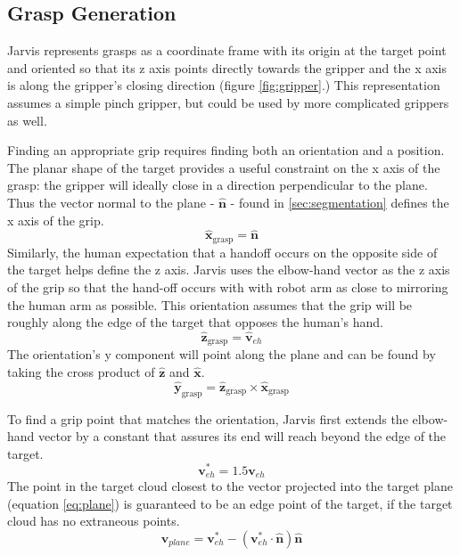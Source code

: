 \documentclass[10pt]{article}
\begin{document}
\subsection{Grasp Generation}\label{sec:graspgen} 
Jarvis represents grasps as a coordinate frame with its origin at the target point and oriented so that its z axis points directly towards the gripper and the x axis is along the gripper's closing direction (figure \ref{fig:gripper}.) This representation assumes a simple pinch gripper, but could be used by more complicated grippers as well. 
\par Finding an appropriate grip requires finding both an orientation and a position. The planar shape of the target provides a useful constraint on the x axis of the grasp: the gripper will ideally close in a direction perpendicular to the plane. Thus the vector normal to the plane - $\hat{\textbf{n}}$ - found in \ref{sec:segmentation} defines the x axis of the grip.
\begin{equation}
\hat{\textbf{x}}_{\text{grasp}} = \hat{\textbf{n}}
\end{equation}
 Similarly, the human expectation that a handoff occurs on the opposite side of the target helps define the z axis. Jarvis uses the elbow-hand vector as the z axis of the grip so that the hand-off occurs with with robot arm as close to mirroring the human arm as possible. This orientation assumes that the grip will be roughly along the edge of the target that opposes the human's hand.
 \begin{equation}
\hat{\textbf{z}}_{\text{grasp}} = \hat{\textbf{v}}_{eh}
\end{equation}
The orientation's y component will point along the plane and can be found by taking the cross product of $\hat{\textbf{z}}$ and $\hat{\textbf{x}}$.
\begin{equation}
\hat{\textbf{y}}_{\text{grasp}} = \hat{\textbf{z}}_{\text{grasp}} \times \hat{\textbf{x}}_{\text{grasp}}
\end{equation}
\par To find a grip point that matches the orientation,  Jarvis first extends the elbow-hand vector by a constant that assures its end will reach beyond the edge of the target.
\begin{equation} \label{eq:vec_ext}
\textbf{v}_{eh}^* = 1.5 \textbf{v}_{eh}
\end{equation}
The point in the target cloud closest to the vector projected into the target plane (equation \ref{eq:plane}) is guaranteed to be an edge point of the target, if the target cloud has no extraneous points. 
\begin{equation} \label{eq:planar_proj}
\textbf{v}_{plane} = \textbf{v}_{eh}^* - 
				\left(\textbf{v}_{eh}^* \cdot \hat{\textbf{n}} \right) \hat{\textbf{n}}
\end{equation}
\end{document}
